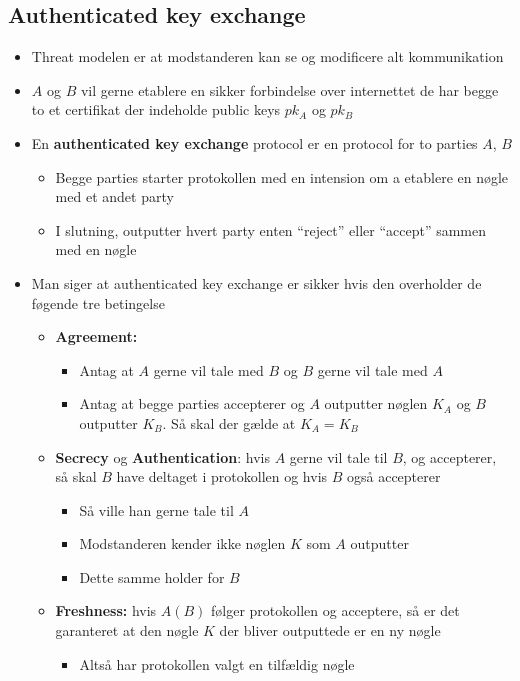 \documentclass[a4, english]{article}
\begin{document}
\subsection{Authenticated key exchange}
\begin{itemize}
	\item Threat modelen er at modstanderen kan se og modificere alt kommunikation  
  \item $A$ og $B$ vil gerne etablere en sikker forbindelse over internettet de har begge to et certifikat der indeholde public keys $pk_A$ og $pk_B$  
  \item En \textbf{authenticated key exchange} protocol er en protocol for to parties $A$, $B$ 
  \begin{itemize}
  	\item Begge parties starter protokollen med en intension om a etablere en nøgle med et andet party  
    \item I slutning, outputter hvert party enten ``reject'' eller ``accept'' sammen med en nøgle
  \end{itemize}
  \item Man siger at authenticated key exchange er sikker hvis den overholder de føgende tre betingelse
  \begin{itemize}
    \item \textbf{Agreement:}
    \begin{itemize}
      \item Antag at $A$ gerne vil tale med $B$ og $B$ gerne vil tale med $A$ 
      \item Antag at begge parties accepterer og $A$ outputter nøglen $K_A$ og $B$ outputter $K_B$. Så skal der gælde at $K_A = K_B$  
    \end{itemize}
    \item \textbf{Secrecy} og \textbf{Authentication}: hvis $A$ gerne vil tale til $B$, og accepterer, så skal $B$ have deltaget i protokollen og hvis $B$ også accepterer
    \begin{itemize}
    	\item Så ville han gerne tale til $A$   
      \item Modstanderen kender ikke nøglen $K$ som $A$ outputter
      \item Dette samme holder for $B$ 
    \end{itemize}
    \item \textbf{Freshness:} hvis $A(B)$ følger protokollen og acceptere, så er det garanteret at den nøgle $K$ der bliver outputtede er en ny nøgle   
    \begin{itemize}
    	\item Altså har protokollen valgt en tilfældig nøgle
    \end{itemize}
  \end{itemize}
\end{itemize} 
\end{document}
